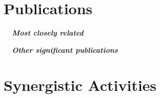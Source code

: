 \documentclass[12pt]{article}
\makeatletter
\newcommand*{\newbibstartnumber}[1]{%
  \apptocmd{\thebibliography}{%
    \global\c@NAT@ctr #1\relax
    \addtocounter{NAT@ctr}{-1}%
  }{}{}%
}
\makeatother
\begin{document}
\section{Publications}

\vspace{2mm}
\noindent \textbf{\textit{\ \ Most closely related}}
\begin{bibunit}
\nocite{apsrev42Control}
\nocite{PirieNatPhys2020,MattPRB2020,WebbPRX2019,GozarNanoLett2017,HuangPRL2015}
\putbib[publications]
\end{bibunit}

\vspace{2mm}
\noindent \textbf{\textit{\ \ Other significant publications}}
\newbibstartnumber{6}
\begin{bibunit}
\nocite{apsrev42Control}
\nocite{CominScience2014,ZeljkovicNanoLetters2014,SoumyanarayananPNAS2013,ZeljkovicScience2012,HoffmanScience2002qpi}
\putbib[publications]
\end{bibunit}

\section{Synergistic Activities}
\end{document}
